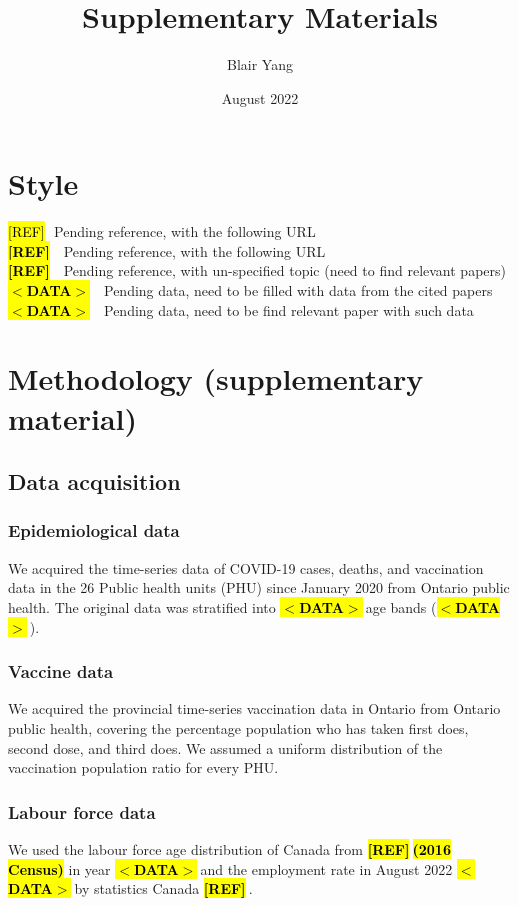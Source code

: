 \documentclass[12pt]{article}
\title{Supplementary Materials}
\author{Blair Yang}
\date{August 2022}
\newcommand{\emphasize}[1]{\textcolor{ReD}{\textbf{\hl{#1}}}}
\newcommand{\urlref}{\hl{[REF]}}
\newcommand{\pendingref}{\textbf{\hl{[REF]}}$ \ $}
\newcommand{\unknownref}{\textcolor{ReD}{\textbf{\hl{[REF]}}}$ \ $}
\newcommand{\pendingdata}{\textbf{\hl{$<$DATA$>$}}$ \ $}
\newcommand{\unknowndata}{\textcolor{ReD}{\textbf{\hl{$<$DATA$>$}}}$ \ $}
\begin{document}
\section*{Style}
\urlref $ \ \ \ $Pending reference, with the following URL\\
\pendingref $ \ \ $ Pending reference, with the following URL\\
\unknownref $ \ \ $ Pending reference, with un-specified topic (need to find relevant papers)\\
\pendingdata $ \ \ $ Pending data, need to be filled with data from the cited papers\\
\unknowndata $ \ \ $ Pending data, need to be find relevant paper with such data

\section{Methodology (supplementary material)}
\subsection{Data acquisition}

\subsubsection{Epidemiological data}

We acquired the time-series data of COVID-19 cases, deaths, and vaccination data in the 26 Public health units (PHU) since January 2020 from Ontario public health. \cite{ref1} The original data was stratified into \pendingdata age bands (\pendingdata).

\subsubsection{Vaccine data}

We acquired the provincial time-series vaccination data in Ontario from Ontario public health, covering the percentage population who has taken first does, second dose, and third does. We assumed a uniform distribution of the vaccination population ratio for every PHU. 

\subsubsection{Labour force data}

We used the labour force age distribution of Canada from \pendingref \emphasize{(2016 Census)} in year \pendingdata and the employment rate in August 2022 \pendingdata by statistics Canada \pendingref. 
\end{document}
